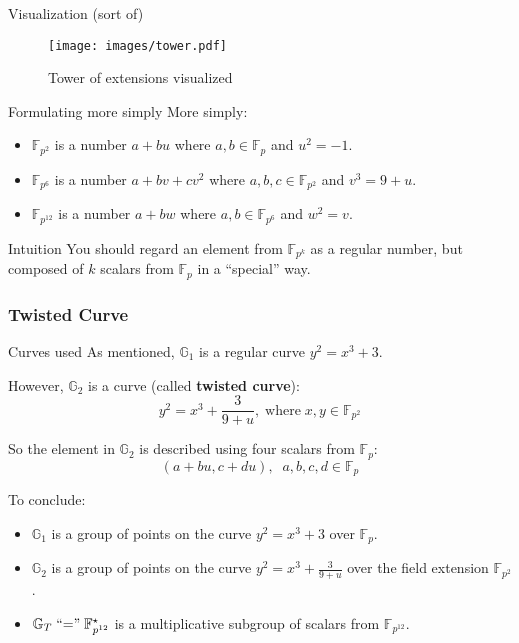 \documentclass[xcolor={usenames,dvipsnames}]{beamer}
\begin{document}
    \begin{frame}{Visualization (sort of)}
       \begin{figure}
        \centering
        \texttt{[image: images/tower.pdf]}
        \caption{Tower of extensions visualized}
    \end{figure} 
    \end{frame}

    \begin{frame}{Formulating more simply}
        More simply:
        \begin{itemize}
            \item $\mathbb{F}_{p^2}$ is a number $a+bu$ where $a,b\in\mathbb{F}_p$ and $u^2=-1$.
            \item $\mathbb{F}_{p^6}$ is a number $a+bv+cv^2$ where $a,b,c \in \mathbb{F}_{p^2}$ and $v^3 = 9+u$.
            \item $\mathbb{F}_{p^{12}}$ is a number $a+bw$ where $a,b \in \mathbb{F}_{p^6}$ and $w^2=v$.\pause
        \end{itemize}

        \begin{exampleblock}{Intuition}
            You should regard an element from $\mathbb{F}_{p^k}$ as a regular number, but composed of $k$ scalars from $\mathbb{F}_p$ in a ``special'' way.
        \end{exampleblock}
    \end{frame}

    \subsubsection{Twisted Curve}

    \begin{frame}{Curves used}
        As mentioned, $\mathbb{G}_1$ is a regular curve $y^2 = x^3+3$.
        
        However, $\mathbb{G}_2$ is a curve (called \textbf{twisted curve}):
        \begin{equation*}
            y^2 = x^3 + \frac{3}{9+u}, \; \text{where}\; x,y \in \mathbb{F}_{p^2}
        \end{equation*}

        \pause So the element in $\mathbb{G}_2$ is described using four scalars from $\mathbb{F}_p$:
        \begin{equation*}
            (a+bu, c+du), \;\; a,b,c,d \in \mathbb{F}_p
        \end{equation*}

        \pause To conclude:
        \begin{itemize}
            \item $\mathbb{G}_1$ is a group of points on the curve $y^2=x^3+3$ over $\mathbb{F}_p$.
            \item $\mathbb{G}_2$ is a group of points on the curve $y^2=x^3+\frac{3}{9+u}$ over the field extension $\mathbb{F}_{p^2}$.
            \item $\mathbb{G}_T \text{\;``=''\;} \mathbb{F}_{p^{12}}^{\star}$ is a multiplicative subgroup of scalars from $\mathbb{F}_{p^{12}}$.
        \end{itemize}
    \end{frame}
    
\end{document}
